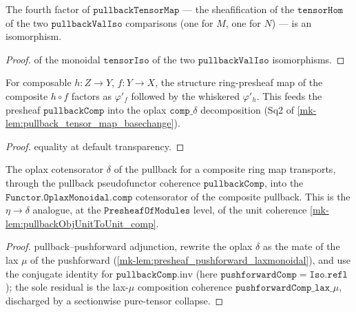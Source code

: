 \begin{lemma}\label{mk-lem:isiso_sheafify_tensorhom_pullbackvaliso}
  \leanok

  The fourth factor of \(\mathtt{pullbackTensorMap}\) --- the sheafification of the
  \(\mathtt{tensorHom}\) of the two \(\mathtt{pullbackValIso}\) comparisons (one for \(M\),
  one for \(N\)) --- is an isomorphism.
\end{lemma}
\begin{proof}
  \leanok
  of the monoidal \(\mathtt{tensorIso}\) of the two \(\mathtt{pullbackValIso}\) isomorphisms.
\end{proof}

\begin{lemma}\label{mk-lem:toringcatsheafhom_comp_hom_reconcile}
  \leanok

  For composable \(h : Z \to Y\), \(f : Y \to X\), the structure ring-presheaf map of the
  composite \(h \circ f\) factors as \(\varphi'_f\) followed by the whiskered \(\varphi'_h\).
  This feeds the presheaf \(\mathtt{pullbackComp}\) into the oplax \(\mathtt{comp\_}\delta\)
  decomposition (Sq2 of \ref{mk-lem:pullback_tensor_map_basechange}).
\end{lemma}
\begin{proof}
  \leanok
  equality at default transparency.
\end{proof}

\begin{lemma}\label{mk-lem:pullbackcomp_delta}
  \leanok

  The oplax cotensorator \(\delta\) of the pullback for a composite ring map transports,
  through the pullback pseudofunctor coherence \(\mathtt{pullbackComp}\), into the
  \(\mathtt{Functor.OplaxMonoidal.comp}\) cotensorator of the composite pullback. This is the
  \(\eta \to \delta\) analogue, at the \(\mathtt{PresheafOfModules}\) level, of the unit
  coherence \ref{mk-lem:pullbackObjUnitToUnit_comp}.
\end{lemma}
\begin{proof}
  \leanok
  pullback--pushforward adjunction, rewrite the oplax \(\delta\) as the mate of the lax
  \(\mu\) of the pushforward (\ref{mk-lem:presheaf_pushforward_laxmonoidal}), and use the
  conjugate identity for \(\mathtt{pullbackComp}.\mathrm{inv}\) (here \(\mathtt{pushforwardComp}
  = \mathtt{Iso.refl}\)); the sole residual is the lax-\(\mu\) composition coherence
  \(\mathtt{pushforwardComp\_lax\_}\mu\), discharged by a sectionwise pure-tensor collapse.
\end{proof}

